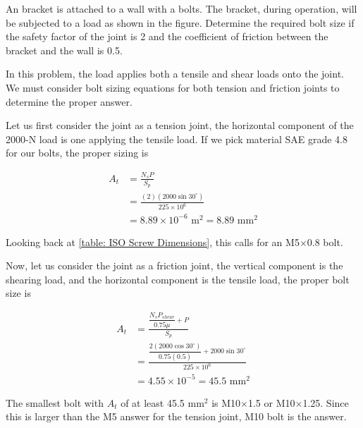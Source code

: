 \documentclass[
10pt,
a4paper,
openany,
svgnames,
]{book}
\begin{document}
\begin{example}
  An bracket is attached to a wall with a bolts. The bracket, during operation, will be subjected to a load as shown in the figure. Determine the required bolt size if the safety factor of the joint is 2 and the coefficient of friction between the bracket and the wall is 0.5.

  \centering
\end{example}
\begin{solution}
  In this problem, the load applies both a tensile and shear loads onto the joint. We must consider bolt sizing equations for both tension and friction joints to determine the proper answer.

  Let us first consider the joint as a tension joint, the horizontal component of the 2000-N load is one applying the tensile load. If we pick material SAE grade 4.8 for our bolts, the proper sizing is

  \begin{align*}
    A_t &= \frac{N_s P}{S_p} \\
        &= \frac{(2)(2000 \sin 30^{\circ})}{225 \times 10^6} \\
        &= 8.89 \times 10^{-6} \text{ m}^2 = 8.89 \text{ mm}^2
  \end{align*}

  Looking back at \cref{table: ISO Screw Dimensions}, this calls for an M5$\times$0.8 bolt.

  Now, let us consider the joint as a friction joint, the vertical component is the shearing load, and the horizontal component is the tensile load, the proper bolt size is

  \begin{align*}
    A_t &= \frac{\dfrac{N_s P_{shear}}{0.75\mu } + P}{S_p} \\
        &= \frac{\dfrac{2(2000 \cos 30^{\circ})}{0.75(0.5)} + 2000 \sin 30^{\circ}}{225 \times 10^6} \\
        &= 4.55 \times 10^{-5} = 45.5 \text{ mm}^2
  \end{align*}

  The smallest bolt with $A_t$ of at least 45.5 mm$^2$ is M10$\times$1.5 or M10$\times$1.25. Since this is larger than the M5 answer for the tension joint, M10 bolt is the answer.
\end{solution}
\end{document}
